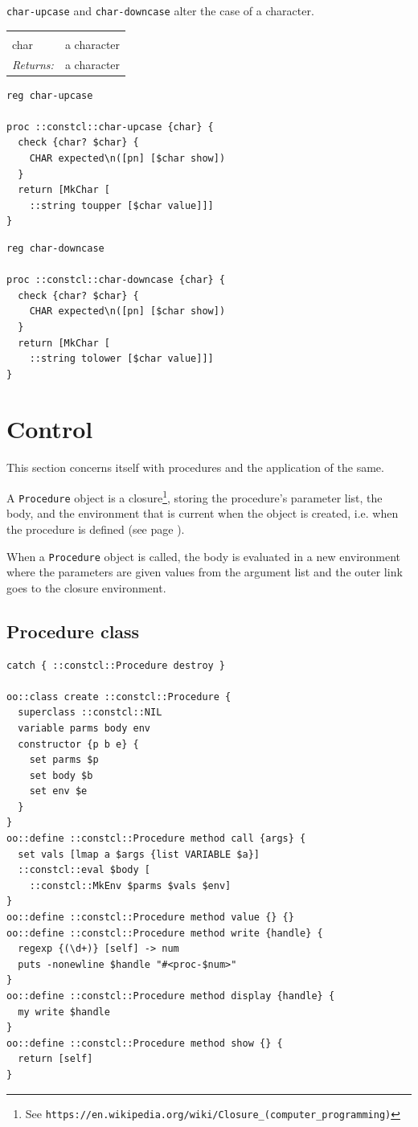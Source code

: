 \documentclass[twoside,9pt]{report}
\begin{document}
\texttt{char-upcase} and \texttt{char-downcase} alter the case of a character.

\noindent\begin{tabular}{ |p{1.9cm} p{8cm}| }
\hline
\rowcolor[HTML]{CCCCCC} \multicolumn{2}{|l|}{\bf char-upcase, char-downcase (public)} \\
char & a character \\
\textit{Returns:} & a character \\
\hline
\end{tabular}
\begin{lstlisting}
reg char-upcase

proc ::constcl::char-upcase {char} {
  check {char? $char} {
    CHAR expected\n([pn] [$char show])
  }
  return [MkChar [
    ::string toupper [$char value]]]
}
\end{lstlisting}
\begin{lstlisting}
reg char-downcase

proc ::constcl::char-downcase {char} {
  check {char? $char} {
    CHAR expected\n([pn] [$char show])
  }
  return [MkChar [
    ::string tolower [$char value]]]
}
\end{lstlisting}
\section{Control}
\label{control}


This section concerns itself with procedures and the application of the same.


A \texttt{Procedure} object is a closure\footnote{See \texttt{https://en.wikipedia.org/wiki/Closure\_(computer\_programming)}}, storing the procedure's parameter list, the body, and the environment that is current when the object is created, i.e. when the procedure is defined (see page \pageref{procedure-definition}).


When a \texttt{Procedure} object is called, the body is evaluated in a new environment where the parameters are given values from the argument list and the outer link goes to the closure environment.

\subsection{Procedure class}
\label{procedure-class}
\begin{lstlisting}
catch { ::constcl::Procedure destroy }

oo::class create ::constcl::Procedure {
  superclass ::constcl::NIL
  variable parms body env
  constructor {p b e} {
    set parms $p
    set body $b
    set env $e
  }
}
oo::define ::constcl::Procedure method call {args} {
  set vals [lmap a $args {list VARIABLE $a}]
  ::constcl::eval $body [
    ::constcl::MkEnv $parms $vals $env]
}
oo::define ::constcl::Procedure method value {} {}
oo::define ::constcl::Procedure method write {handle} {
  regexp {(\d+)} [self] -> num
  puts -nonewline $handle "#<proc-$num>"
}
oo::define ::constcl::Procedure method display {handle} {
  my write $handle
}
oo::define ::constcl::Procedure method show {} {
  return [self]
}
\end{lstlisting}
\end{document}
